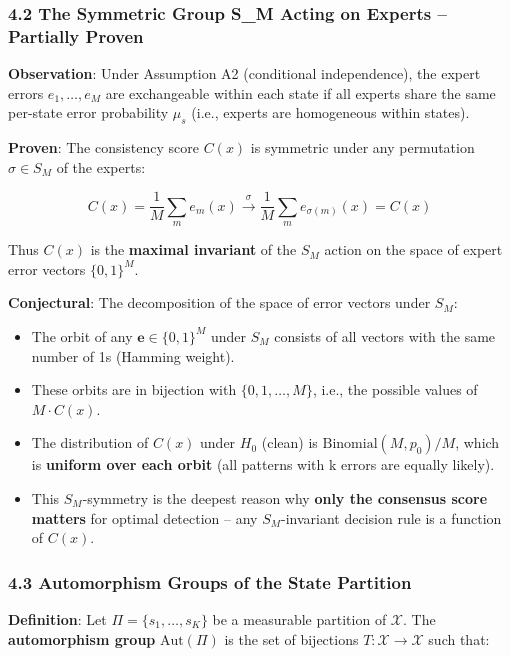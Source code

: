 \documentclass[
  12pt,
]{ctexart}
\providecommand{\tightlist}{%
  \setlength{\itemsep}{0pt}\setlength{\parskip}{0pt}}
\begin{document}
\subsubsection{4.2 The Symmetric Group S\_M Acting on Experts --
Partially
Proven}\label{the-symmetric-group-s_m-acting-on-experts-partially-proven}

\textbf{Observation}: Under Assumption A2 (conditional independence),
the expert errors \(e_1, \dots, e_M\) are exchangeable within each state
if all experts share the same per-state error probability \(\mu_s\)
(i.e., experts are homogeneous within states).

\textbf{Proven}: The consistency score \(C(x)\) is symmetric under any
permutation \(\sigma \in S_M\) of the experts:

\[C(x) = \frac{1}{M}\sum_m e_m(x) \xrightarrow{\sigma} \frac{1}{M}\sum_m e_{\sigma(m)}(x) = C(x)\]

Thus \(C(x)\) is the \textbf{maximal invariant} of the \(S_M\) action on
the space of expert error vectors \(\{0,1\}^M\).

\textbf{Conjectural}: The decomposition of the space of error vectors
under \(S_M\):

\begin{itemize}
\tightlist
\item
  The orbit of any \(\mathbf{e} \in \{0,1\}^M\) under \(S_M\) consists
  of all vectors with the same number of 1s (Hamming weight).
\item
  These orbits are in bijection with \(\{0, 1, \dots, M\}\), i.e., the
  possible values of \(M \cdot C(x)\).
\item
  The distribution of \(C(x)\) under \(H_0\) (clean) is
  \(\text{Binomial}(M, p_0)/M\), which is \textbf{uniform over each
  orbit} (all patterns with k errors are equally likely).
\item
  This \(S_M\)-symmetry is the deepest reason why \textbf{only the
  consensus score matters} for optimal detection -- any
  \(S_M\)-invariant decision rule is a function of \(C(x)\).
\end{itemize}

\subsubsection{4.3 Automorphism Groups of the State
Partition}\label{automorphism-groups-of-the-state-partition}

\textbf{Definition}: Let \(\Pi = \{s_1, \dots, s_K\}\) be a measurable
partition of \(\mathcal{X}\). The \textbf{automorphism group}
\(\text{Aut}(\Pi)\) is the set of bijections
\(T: \mathcal{X} \to \mathcal{X}\) such that:
\end{document}
